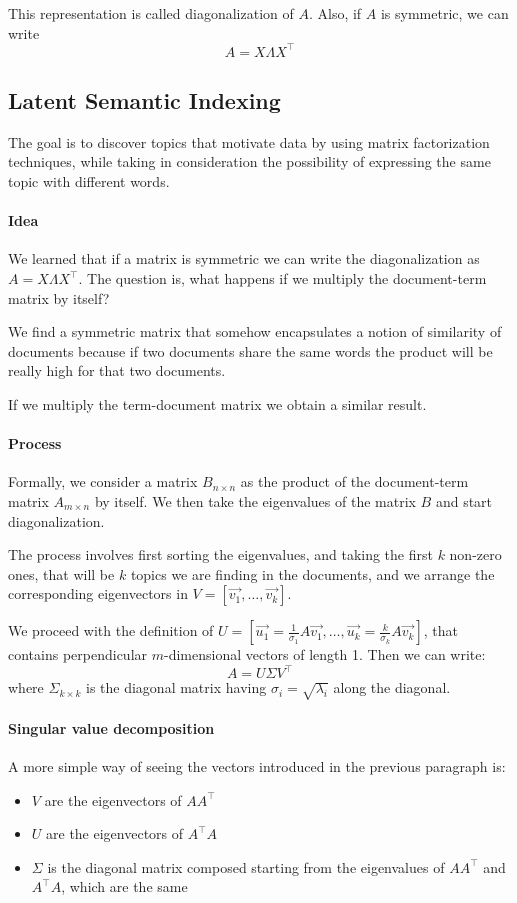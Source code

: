 This representation is called diagonalization of $A$.
Also, if $A$ is symmetric, we can write
$$A = X\varLambda X^{\top}$$

\subsection{Latent Semantic Indexing}
The goal is to discover topics that motivate data
by using matrix factorization techniques, while 
taking in consideration the possibility of expressing
the same topic with different words.

\paragraph{Idea}
We learned that if a matrix is symmetric we can write the 
diagonalization as $A = X\varLambda X^{\top}$.
The question is, what happens if we multiply the 
document-term matrix by itself? 

We find a symmetric matrix that somehow encapsulates a notion of similarity 
of documents because if two documents share the same words the 
product will be really high for that two documents.

If we multiply the term-document matrix we obtain a similar result.

\paragraph{Process}
Formally, we consider a matrix $B_{n\times n}$ as the product of the document-term 
matrix $A_{m\times n}$ by itself.
We then take the eigenvalues of the matrix $B$ and start diagonalization.

The process involves first sorting the eigenvalues, and taking the first 
$k$ non-zero ones, that will be $k$ topics we are finding in the documents, 
and we arrange the corresponding eigenvectors in $V = [\vec{v_1}, \dots, \vec{v_k}]$.

We proceed with the definition of $U = [\vec{u_1} = \frac{1}{\sigma_1}A\vec{v_1}, \dots, 
\vec{u_k} = \frac{k}{\sigma_k}A\vec{v_k}]$, that contains perpendicular $m$-dimensional 
vectors of length 1. Then we can write:
$$A = U \Sigma V^\top$$
where $\Sigma_{k \times k}$ is the diagonal matrix having $\sigma_i = \sqrt{\lambda_i}$ along the diagonal.

\paragraph{Singular value decomposition}
A more simple way of seeing the vectors introduced in the previous paragraph is:
\begin{itemize}
    \item$V$ are the eigenvectors of $AA^\top$
    \item$U$ are the eigenvectors of $A^\top A$
    \item $\Sigma$ is the diagonal matrix composed starting from the eigenvalues
    of $A A^\top$ and $A^\top A$, which are the same
\end{itemize}

